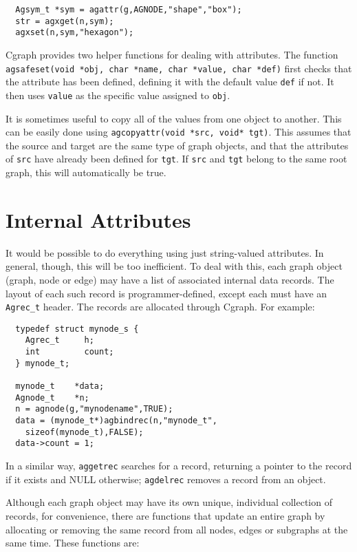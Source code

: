 \documentclass[11pt,letterpaper]{article}
\begin{document}
\begin{verbatim}
  Agsym_t *sym = agattr(g,AGNODE,"shape","box");
  str = agxget(n,sym);
  agxset(n,sym,"hexagon");
\end{verbatim}

Cgraph provides two helper functions for dealing with attributes. The function
\verb"agsafeset(void *obj, char *name, char *value, char *def)" first checks
that the attribute has been defined, defining it with the default value \verb"def"
if not. It then uses \verb"value" as the specific value assigned to \verb"obj".

It is sometimes useful to copy all of the values from one object to another. This can
be easily done using \verb"agcopyattr(void *src, void* tgt)". This assumes that the
source and target are the same type of graph objects, and that the attributes of
\verb"src" have already been defined for \verb"tgt". If \verb"src" and \verb"tgt"
belong to the same root graph, this will automatically be true.

\section{Internal Attributes}
\label{sec:internalattributes}

It would be possible to do everything using just string-valued
attributes. In general, though, this will be too inefficient.
To deal with this,
each graph object (graph, node or edge) may have a list of
associated internal data records.  The layout of each such
record is programmer-defined, except each must have an
\verb"Agrec_t" header.  The records are allocated through
Cgraph.  For example:

\begin{verbatim}
  typedef struct mynode_s {
    Agrec_t     h;
    int         count;
  } mynode_t;

  mynode_t    *data;
  Agnode_t    *n;
  n = agnode(g,"mynodename",TRUE);
  data = (mynode_t*)agbindrec(n,"mynode_t",
    sizeof(mynode_t),FALSE);
  data->count = 1;
\end{verbatim}

In a similar way, \verb"aggetrec" searches for a record, returning a pointer
to the record if it exists and NULL otherwise;
\verb"agdelrec" removes a record from an object. 

Although each graph object may have its own unique, individual collection
of records, for convenience, there are functions that update an entire graph
by allocating or removing the same record from all nodes,
edges or subgraphs at the same time.  These functions are:
\end{document}
